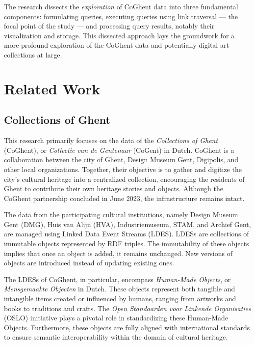 \documentclass[conference]{IEEEtran}
\begin{document}
The research dissects the \textit{exploration} of CoGhent data into three fundamental components: formulating queries, executing queries using link traversal — the focal point of the study — and processing query results, notably their visualization and storage. This dissected approach lays the groundwork for a more profound exploration of the CoGhent data and potentially digital art collections at large.

\section{Related Work}

\subsection{Collections of Ghent}
This research primarily focuses on the data of the \textit{Collections of Ghent} (CoGhent), or \textit{Collectie van de Gentenaar} (CoGent) in Dutch. CoGhent is a collaboration between the city of Ghent, Design Museum Gent, Digipolis, and other local organizations. Together, their objective is to gather and digitize the city's cultural heritage into a centralized collection, encouraging the residents of Ghent to contribute their own heritage stories and objects. Although the CoGhent partnership concluded in June 2023, the infrastructure remains intact. \cite{leemputten2022gent} \cite{schouppe2022gent}

The data from the participating cultural institutions, namely Design Museum Gent (DMG), Huis van Alijn (HVA), Industriemuseum, STAM, and Archief Gent, are managed using Linked Data Event Streams (LDES). LDESs are collections of immutable objects represented by RDF triples. The immutability of these objects implies that once an object is added, it remains unchanged. New versions of objects are introduced instead of updating existing ones. \cite{floreverk2022coghent} \cite{colpaert2023ldes}

The LDESs of CoGhent, in particular, encompass \textit{Human-Made Objects}, or \textit{Mensgemaakte Objecten} in Dutch. These objects represent both tangible and intangible items created or influenced by humans, ranging from artworks and books to traditions and crafts. The \textit{Open Standaarden voor Linkende Organisaties} (OSLO) initiative plays a pivotal role in standardizing these Human-Made Objects. Furthermore, these objects are fully aligned with international standards to ensure semantic interoperability within the domain of cultural heritage. \cite{van2022publishing} \cite{vanderperren2021oslo}
\end{document}
